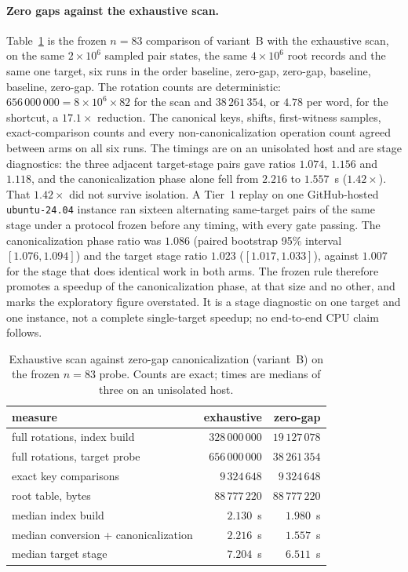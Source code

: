\paragraph{Zero gaps against the exhaustive scan.}
Table~\ref{tab:zerogap} is the frozen $n=83$ comparison of
variant~B with the exhaustive scan, on the same $2\times10^6$ sampled
pair states, the same $4\times10^6$ root records and the same one
target, six runs in the order baseline, zero-gap, zero-gap, baseline,
baseline, zero-gap.
The rotation counts are deterministic: $656\,000\,000=8\times10^6\times82$
for the scan and $38\,261\,354$, or $4.78$ per word, for the shortcut, a
$17.1\times$ reduction. The canonical keys, shifts, first-witness
samples, exact-comparison counts and every non-canonicalization
operation count agreed between arms on all six runs. The timings are
on an unisolated host and are stage diagnostics: the three adjacent
target-stage pairs gave ratios $1.074$, $1.156$ and $1.118$, and the
canonicalization phase alone fell from $2.216$ to $1.557$~s
($1.42\times$). That $1.42\times$ did not survive isolation. A
Tier~1 replay on one GitHub-hosted \texttt{ubuntu-24.04} instance ran
sixteen alternating same-target pairs of the same stage under a
protocol frozen before any timing, with every gate passing. The
canonicalization phase ratio was $1.086$ (paired bootstrap 95\%
interval $[1.076, 1.094]$) and the target stage ratio $1.023$
($[1.017, 1.033]$), against $1.007$ for the stage that does identical
work in both arms. The frozen rule therefore promotes a speedup of the
canonicalization phase, at that size and no other, and marks the
exploratory figure overstated. It is a stage diagnostic on one target
and one instance, not a complete single-target speedup; no end-to-end
CPU claim follows.

\begin{table}[t]
\centering\small
\caption{Exhaustive scan against zero-gap canonicalization (variant~B) on the frozen $n=83$ probe. Counts are exact; times are medians of three on an unisolated host.}
\label{tab:zerogap}
\begin{tabular}{@{}lrr@{}}
\toprule
measure & exhaustive & zero-gap \\
\midrule
full rotations, index build & $328\,000\,000$ & $19\,127\,078$ \\
full rotations, target probe & $656\,000\,000$ & $38\,261\,354$ \\
exact key comparisons & $9\,324\,648$ & $9\,324\,648$ \\
root table, bytes & $88\,777\,220$ & $88\,777\,220$ \\
median index build & $2.130$~s & $1.980$~s \\
median conversion + canonicalization & $2.216$~s & $1.557$~s \\
median target stage & $7.204$~s & $6.511$~s \\
\bottomrule
\end{tabular}
\end{table}

